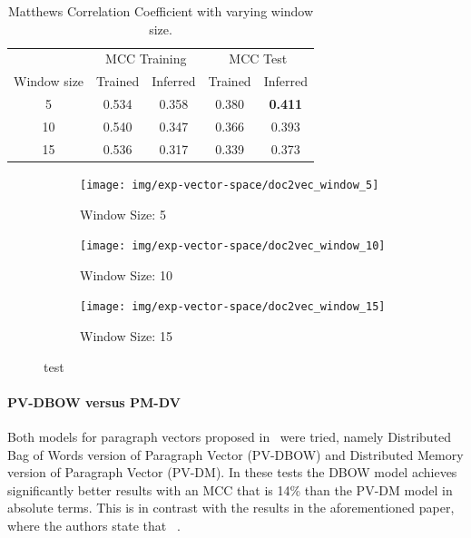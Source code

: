 \begin{table}[h]
  \begin{center}
    \begin{tabular}{ c | *2c | *2c }
      \toprule
       & \multicolumn{2}{c|}{MCC Training} & \multicolumn{2}{|c}{MCC Test}\\
      Window size & Trained & Inferred & Trained & Inferred \\
      \midrule
      5 & 0.534 & 0.358 & 0.380 & \textbf{0.411} \\
      10 & 0.540 & 0.347 & 0.366 & 0.393 \\
      15 & 0.536 & 0.317 & 0.339 & 0.373 \\
    \bottomrule
    \end{tabular}
  \caption{Matthews Correlation Coefficient with varying window size.}
\label{tab:Paragraph Vector Parameter Results Window Size}
\end{center}
\end{table}

\begin{figure}[h!]
    \centering
    \begin{subfigure}[b]{0.49\textwidth}
      \texttt{[image: img/exp-vector-space/doc2vec\_window\_5]}
      \caption{Window Size: 5}
\label{fig:doc2vec_window_5}
    \end{subfigure}
    \begin{subfigure}[b]{0.49\textwidth}
      \texttt{[image: img/exp-vector-space/doc2vec\_window\_10]}
    \caption{Window Size: 10}
\label{fig:doc2vec_window_10}
    \end{subfigure}
    \begin{subfigure}[b]{0.49\textwidth}
      \texttt{[image: img/exp-vector-space/doc2vec\_window\_15]}
      \caption{Window Size: 15}
\label{fig:doc2vec_window_15}
  \end{subfigure}
\caption{test}
\label{fig:window}
\end{figure}


\paragraph{PV-DBOW versus PM-DV}
Both models for paragraph vectors proposed in~\cite{Le:2014aa} were tried, namely Distributed Bag of Words version of Paragraph Vector (PV-DBOW) and Distributed Memory version of Paragraph Vector (PV-DM). In these tests the DBOW model achieves significantly better results with an MCC that is 14\% than the PV-DM model in absolute terms. This is in contrast with the results in the aforementioned paper, where the authors state that ~\cite{Le:2014aa}.

